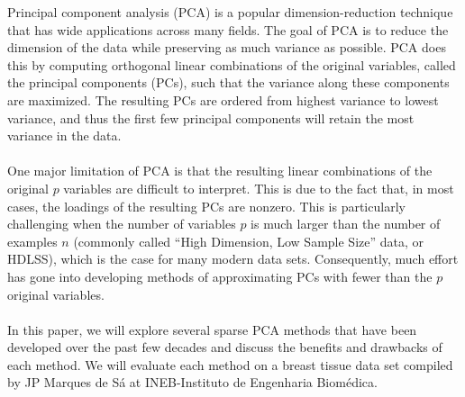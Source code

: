 \documentclass[12pt,letterpaper]{report}
\begin{document}
Principal component analysis (PCA) is a popular dimension-reduction technique that has wide applications across many fields. The goal of PCA is to reduce the dimension of the data while preserving as much variance as possible. PCA does this by computing orthogonal linear combinations of the original variables, called the principal components (PCs), such that the variance along these components are maximized.  The resulting PCs are ordered from highest variance to lowest variance, and thus the first few principal components will retain the most variance in the data.\\
\\
One major limitation of PCA is that the resulting linear combinations of the original $p$ variables are difficult to interpret. This is due to the fact that, in most cases, the loadings of the resulting PCs are nonzero. This is particularly challenging when the number of variables $p$ is much larger than the number of examples $n$ (commonly called “High Dimension, Low Sample Size” data, or HDLSS), which is the case for many modern data sets. Consequently, much effort has gone into developing methods of approximating PCs with fewer than the $p$ original variables.\\
\\
In this paper, we will explore several sparse PCA methods that have been developed over the past few decades and discuss the benefits and drawbacks of each method. We will evaluate each method on a breast tissue data set compiled by JP Marques de Sá at INEB-Instituto de Engenharia Biomédica.
\end{document}
